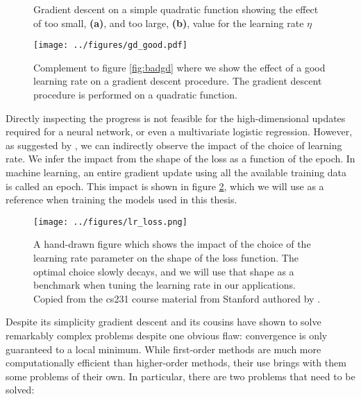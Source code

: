\begin{figure}
\centering
\caption[Sub-optimal gradient descent]{Gradient descent on a simple quadratic function showing the effect of too small, \textbf{(a)}, and too large, \textbf{(b)}, value for the learning rate $\eta$}\label{fig:badgd}
\texttt{[image: ../figures/gd\_good.pdf]}
\caption[Optimal gradient descent]{Complement to figure \ref{fig:badgd} where we show the effect of a good learning rate on a gradient descent procedure. The gradient descent procedure is performed on a quadratic function.}\label{fig:goodgd}
\end{figure}

Directly inspecting the progress is not feasible for the high-dimensional updates required for a neural network, or even a multivariate logistic regression. However, as suggested by \citet{Karpathy}, we can indirectly observe the impact of the choice of learning rate. We infer the impact from the shape of the loss as a function of the epoch. In machine learning, an entire gradient update using all the available training data is called an epoch. This impact is shown in figure \ref{fig:lrloss}, which we will use as a reference when training the models used in this thesis. 

\begin{figure}
\centering
\texttt{[image: ../figures/lr\_loss.png]}
\caption[The impact of $\eta$ on performance]{A hand-drawn figure which shows the impact of the choice of the learning rate parameter on the shape of the loss function. The optimal choice slowly decays, and we will use that shape as a benchmark when tuning the learning rate in our applications. Copied from the cs231 course material from Stanford authored by \citet{Karpathy}.}\label{fig:lrloss}

\end{figure} 

Despite its simplicity gradient descent and its cousins have shown to solve remarkably complex problems despite one obvious flaw: convergence is only guaranteed to a local minimum. While first-order methods are much more computationally efficient than higher-order methods, their use brings with them some problems of their own. In particular, there are two problems that need to be solved:


